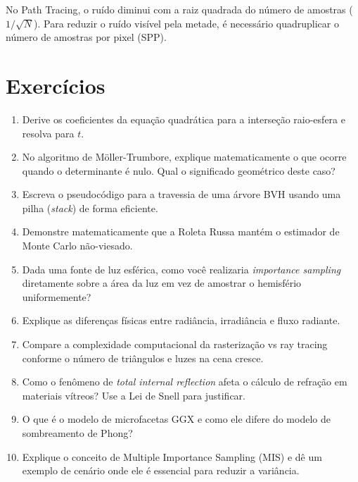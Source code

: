 \begin{dica}
    No Path Tracing, o ruído diminui com a raiz quadrada do número de amostras ($1/\sqrt{N}$). Para reduzir o ruído visível pela metade, é necessário quadruplicar o número de amostras por pixel (SPP).
\end{dica}

\section*{Exercícios}

\begin{enumerate}
    \item Derive os coeficientes da equação quadrática para a interseção raio-esfera e resolva para $t$.
    \item No algoritmo de Möller-Trumbore, explique matematicamente o que ocorre quando o determinante é nulo. Qual o significado geométrico deste caso?
    \item Escreva o pseudocódigo para a travessia de uma árvore BVH usando uma pilha (\textit{stack}) de forma eficiente.
    \item Demonstre matematicamente que a Roleta Russa mantém o estimador de Monte Carlo não-viesado.
    \item Dada uma fonte de luz esférica, como você realizaria \textit{importance sampling} diretamente sobre a área da luz em vez de amostrar o hemisfério uniformemente?
    \item Explique as diferenças físicas entre radiância, irradiância e fluxo radiante.
    \item Compare a complexidade computacional da rasterização vs ray tracing conforme o número de triângulos e luzes na cena cresce.
    \item Como o fenômeno de \textit{total internal reflection} afeta o cálculo de refração em materiais vítreos? Use a Lei de Snell para justificar.
    \item O que é o modelo de microfacetas GGX e como ele difere do modelo de sombreamento de Phong?
    \item Explique o conceito de Multiple Importance Sampling (MIS) e dê um exemplo de cenário onde ele é essencial para reduzir a variância.
\end{enumerate}

